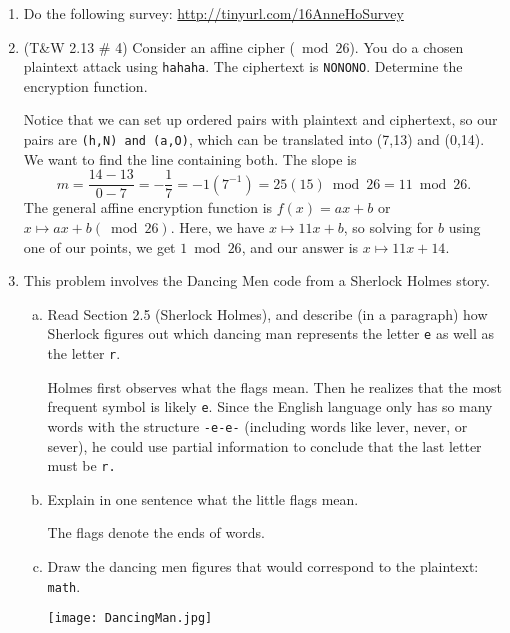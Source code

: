 \documentclass[12pt]{amsart}
\theoremstyle{plain}
\theoremstyle{definition}
\begin{document}
\begin{enumerate}[1.]
	\item Do the following survey: \url{http://tinyurl.com/16AnneHoSurvey}\\
	\item (T\&W 2.13 \# 4)  Consider an affine cipher ($\bmod 26$).  You do a chosen plaintext attack using \texttt{hahaha}.  The ciphertext is \texttt{NONONO}.  Determine the encryption function.\\ \begin{framed}Notice that we can set up ordered pairs with plaintext and ciphertext, so our pairs are \texttt{(h,N) and \texttt{(a,O)}}, which can be translated into (7,13) and (0,14).  We want to find the line containing both.  The slope is $$m = \frac{14-13}{0-7} = -\frac{1}{7} = -1(7^{-1}) = 25(15) \bmod 26 = 11 \bmod 26.$$
	The general affine encryption function is $f(x) = ax+b$ or $x \mapsto ax+b (\bmod 26)$.  Here, we have $x \mapsto 11 x + b$, so solving for $b$ using one of our points, we get $1 \bmod 26$, and our answer is $x \mapsto 11x+14$.\end{framed}
	 \item This problem involves the Dancing Men code from a Sherlock Holmes story.
		\begin{enumerate}[a.]
			\item Read Section 2.5 (Sherlock Holmes), and describe (in a paragraph) how Sherlock figures out which dancing man represents the letter \texttt{e} as well as the letter \texttt{r}.\\ \begin{framed}Holmes first observes what the flags mean.  Then he realizes that the most frequent symbol is likely \texttt{e}.  Since the English language only has so many words with the structure \texttt{-e-e-} (including words like lever, never, or sever), he could use partial information to conclude that the last letter must be \texttt{r.}  \end{framed}
			\item Explain in one sentence what the little flags mean.\\\begin{framed}The flags denote the ends of words.\end{framed}
			\item Draw the dancing men figures that would correspond to the plaintext: \texttt{math}.\\ \begin{framed}\begin{center}\texttt{[image: DancingMan.jpg]}\end{center} \end{framed}

\end{enumerate}
\end{enumerate}
\end{document}
